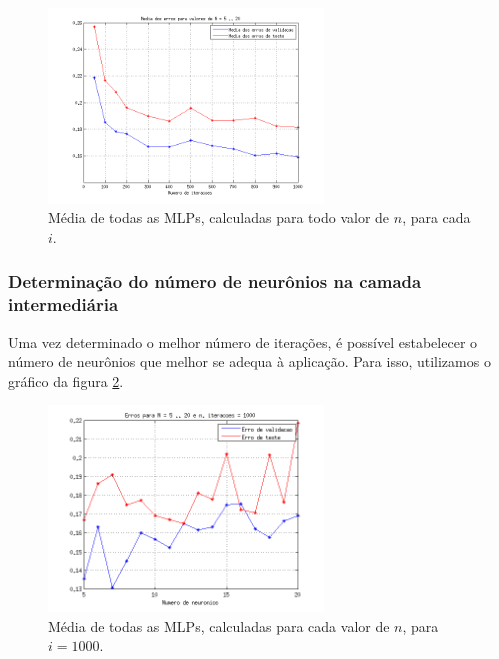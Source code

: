 \begin{figure}[H]
			\centering
			  \includegraphics[width=0.650\textwidth]{image/mlp_average_iterations}
			  \caption{Média de todas as MLPs, calculadas para todo valor de \(n\), para
			  cada \(i\).}
			  \label{fig:avg_iter}
	\end{figure}
	
	\FloatBarrier

\subsubsection{Determinação do número de neurônios na camada intermediária}
\label{sec:neuronios}

Uma vez determinado o melhor número de iterações, é possível estabelecer o
número de neurônios que melhor se adequa à aplicação. Para isso, utilizamos o
gráfico da figura \ref{fig:iter1000}.


	\begin{figure}[H]
			\centering
			  \includegraphics[width=0.650\textwidth]{image/mlp_1000_iterations}
			  \caption{Média de todas as MLPs, calculadas para cada valor de \(n\),
			  para \(i=1000\).}
			  \label{fig:iter1000}
	\end{figure}
	
	\FloatBarrier
	
